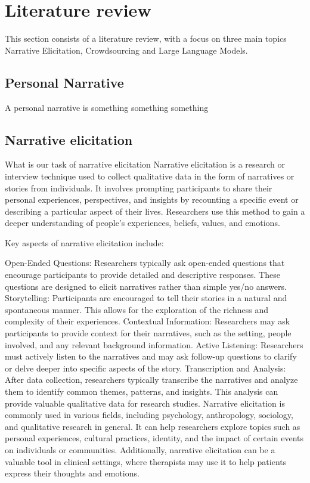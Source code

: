\chapter{Literature review}
\label{cha:literature_review}
This section consists of a literature review, with a focus on three main topics Narrative Elicitation, Crowdsourcing and Large Language Models.
\section{Personal Narrative}
A personal narrative is something something something
\section{Narrative elicitation}
What is our task of narrative elicitation
Narrative elicitation is a research or interview technique used to collect qualitative data in the form of narratives or stories from individuals. It involves prompting participants to share their personal experiences, perspectives, and insights by recounting a specific event or describing a particular aspect of their lives. Researchers use this method to gain a deeper understanding of people's experiences, beliefs, values, and emotions.

Key aspects of narrative elicitation include:

Open-Ended Questions: Researchers typically ask open-ended questions that encourage participants to provide detailed and descriptive responses. These questions are designed to elicit narratives rather than simple yes/no answers.
Storytelling: Participants are encouraged to tell their stories in a natural and spontaneous manner. This allows for the exploration of the richness and complexity of their experiences.
Contextual Information: Researchers may ask participants to provide context for their narratives, such as the setting, people involved, and any relevant background information.
Active Listening: Researchers must actively listen to the narratives and may ask follow-up questions to clarify or delve deeper into specific aspects of the story.
Transcription and Analysis: After data collection, researchers typically transcribe the narratives and analyze them to identify common themes, patterns, and insights. This analysis can provide valuable qualitative data for research studies.
Narrative elicitation is commonly used in various fields, including psychology, anthropology, sociology, and qualitative research in general. It can help researchers explore topics such as personal experiences, cultural practices, identity, and the impact of certain events on individuals or communities. Additionally, narrative elicitation can be a valuable tool in clinical settings, where therapists may use it to help patients express their thoughts and emotions.
